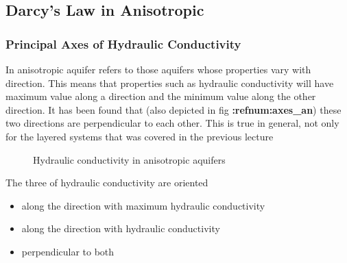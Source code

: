 \documentclass[letterpaper,10pt,english]{sphinxmanual}
\begin{document}
\subsection{Darcy’s Law in Anisotropic}
\label{\detokenize{contents/flow/lecture_06/16_darcy_law_3D:darcy-s-law-in-anisotropic}}

\subsubsection{Principal Axes of Hydraulic Conductivity}
\label{\detokenize{contents/flow/lecture_06/16_darcy_law_3D:principal-axes-of-hydraulic-conductivity}}
In anisotropic aquifer refers to those aquifers whose properties vary with direction. This means that properties such as hydraulic conductivity will have maximum value along a direction and the minimum value along the other direction. It has been found that (also depicted in fig {\color{red}\bfseries{}:refnum:\textasciigrave{}axes\_an\textasciigrave{}}) these two directions are perpendicular to each other. This is true in general, not only for the layered systems that was covered in the previous lecture

\begin{figure}[htbp]
\centering
\capstart

\noindent{}
\caption{Hydraulic conductivity in anisotropic aquifers}\label{\detokenize{contents/flow/lecture_06/16_darcy_law_3D:axes-an}}\end{figure}

The three  of hydraulic conductivity are oriented
\begin{itemize}
\item {} 
along the direction with maximum hydraulic conductivity

\item {} 
along the direction with hydraulic conductivity

\item {} 
perpendicular to both

\end{itemize}
\end{document}
